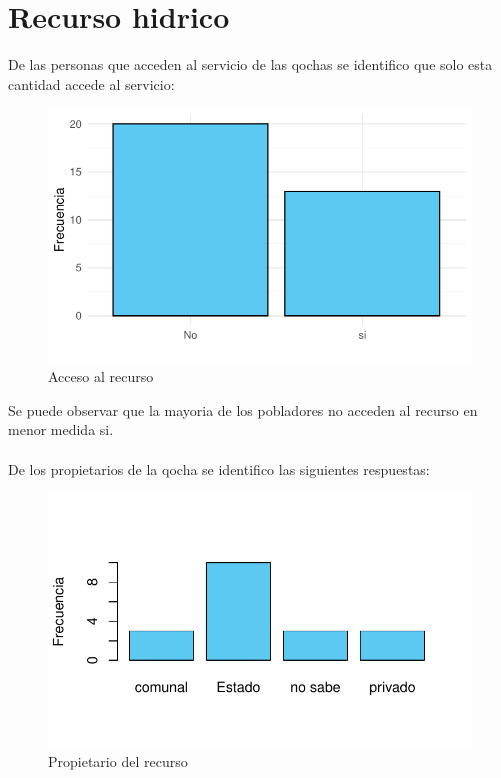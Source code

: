 \documentclass[12pt]{article}\usepackage[]{graphicx}\usepackage[]{xcolor}
\makeatletter
\def\maxwidth{ %
  \ifdim\Gin@nat@width>\linewidth
    \linewidth
  \else
    \Gin@nat@width
  \fi
}
\newenvironment{knitrout}{}{} %
\makeatother
\begin{document}
	\section{Recurso hidrico}
	De las personas que acceden al servicio de las qochas se identifico que solo esta cantidad accede al servicio:
	\begin{figure}[H]
	\centering
\begin{knitrout}
\color{fgcolor}
\includegraphics[width=\maxwidth]{figure/trece-1} 
\end{knitrout}
	\caption{Acceso al recurso}
	\end{figure}
	Se puede observar que la mayoria de los pobladores no acceden al recurso en menor medida si.\\
	\\
	De los propietarios de la qocha se identifico las siguientes respuestas:
	\begin{figure}[H]
	\centering
\begin{knitrout}
\color{fgcolor}
\includegraphics[width=\maxwidth]{figure/catorce-1} 
\end{knitrout}
	\caption{Propietario del recurso}
	\end{figure}
\end{document}
